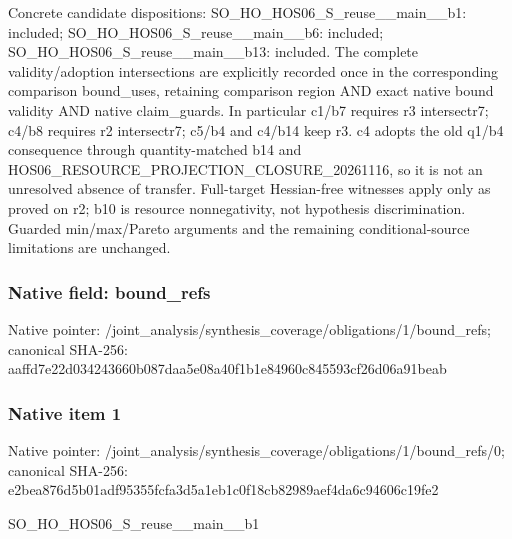 \documentclass[10pt,a4paper]{article}
\begin{document}
\begingroup\raggedright\sloppy Concrete candidate dispositions:\allowbreak{} SO\_\allowbreak{}HO\_\allowbreak{}HOS06\_\allowbreak{}S\_\allowbreak{}reuse\_\allowbreak{}\_\allowbreak{}main\_\allowbreak{}\_\allowbreak{}b1:\allowbreak{} included;\allowbreak{} SO\_\allowbreak{}HO\_\allowbreak{}HOS06\_\allowbreak{}S\_\allowbreak{}reuse\_\allowbreak{}\_\allowbreak{}main\_\allowbreak{}\_\allowbreak{}b6:\allowbreak{} included;\allowbreak{} SO\_\allowbreak{}HO\_\allowbreak{}HOS06\_\allowbreak{}S\_\allowbreak{}reuse\_\allowbreak{}\_\allowbreak{}main\_\allowbreak{}\_\allowbreak{}b13:\allowbreak{} included. The complete validity/\allowbreak{}adoption intersections are explicitly recorded once in the corresponding comparison bound\_\allowbreak{}uses,\allowbreak{} retaining comparison region AND exact native bound validity AND native claim\_\allowbreak{}guards. In particular c1/\allowbreak{}b7 requires r3 intersectr7;\allowbreak{} c4/\allowbreak{}b8 requires r2 intersectr7;\allowbreak{} c5/\allowbreak{}b4 and c4/\allowbreak{}b14 keep r3. c4 adopts the old q1/\allowbreak{}b4 consequence through quantity-matched b14 and HOS06\_\allowbreak{}RESOURCE\_\allowbreak{}PROJECTION\_\allowbreak{}CLOSURE\_\allowbreak{}20261116,\allowbreak{} so it is not an unresolved absence of transfer. Full-target Hessian-free witnesses apply only as proved on r2;\allowbreak{} b10 is resource nonnegativity,\allowbreak{} not hypothesis discrimination. Guarded min/\allowbreak{}max/\allowbreak{}Pareto arguments and the remaining conditional-source limitations are unchanged.\par\endgroup

\subsubsection{Native field: bound\_\allowbreak{}refs}
Native pointer: /joint\_\allowbreak{}analysis/synthesis\_\allowbreak{}coverage/obligations/1/bound\_\allowbreak{}refs; canonical SHA-256: aaffd7e22d034243660b087daa5e08a40f1b1e84960c845593cf26d06a91beab

\subsubsection{Native item 1}
Native pointer: /joint\_\allowbreak{}analysis/synthesis\_\allowbreak{}coverage/obligations/1/bound\_\allowbreak{}refs/0; canonical SHA-256: e2bea876d5b01adf95355fcfa3d5a1eb1c0f18cb82989aef4da6c94606c19fe2

\begingroup\raggedright\sloppy SO\_\allowbreak{}HO\_\allowbreak{}HOS06\_\allowbreak{}S\_\allowbreak{}reuse\_\allowbreak{}\_\allowbreak{}main\_\allowbreak{}\_\allowbreak{}b1\par\endgroup
\end{document}

